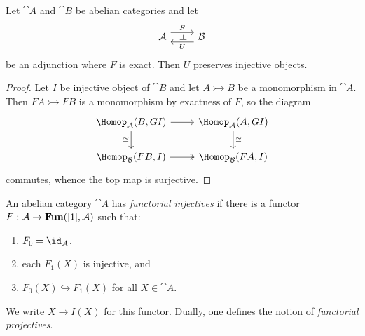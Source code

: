 \documentclass[../main.tex]{subfiles}
\begin{document}
\begin{lem}\label{lem:right-adjoint-to-exact-functor-preserves-injectives}
    Let $\cat A$ and $\cat B$ be abelian categories and let
    \begin{equation*}
      \begin{tikzcd}
        \cat A \ar[r, "F"{name=leftadj}, shift left=2] & \cat B \ar[l, "U"{name=rightadj}, shift left=2]
        \ar[from=leftadj, to=rightadj, phantom, "\leftadj" marking]
      \end{tikzcd}
    \end{equation*}
  be an adjunction where $F$ is exact. Then $U$ preserves injective objects.
\end{lem}
\begin{proof}
    Let $I$ be injective object of \(\cat B\) and let $A \rightarrowtail B$ be a monomorphism in $\cat A$. Then $FA \rightarrowtail FB$ is a monomorphism by exactness of $F$, so the diagram
\[\begin{tikzcd}
	{\Hom[\cat A](B, GI)} & {\Hom[\cat A](A, GI)} \\
	{\Hom[\cat B](FB, I)} & {\Hom[\cat B](FA, I)}
	\arrow[from=1-1, to=1-2]
	\arrow["\cong"', from=1-1, to=2-1]
	\arrow["\cong", from=1-2, to=2-2]
	\arrow[two heads, from=2-1, to=2-2]
\end{tikzcd}\]
commutes, whence the top map is surjective.
\end{proof}

\begin{defn}
    An abelian category $\cat A$ has \emph{functorial injectives} if there is a functor $F\colon \cat A \to \catFunctor([1], \cat A)$ such that:
    \begin{enumerate}
        \item $F_0 = \id_{\cat A}$,
        \item each $F_1(X)$ is injective, and
        \item $F_0(X)\hookrightarrow F_1(X)$ for all $X\in \cat A$.
    \end{enumerate}
    We write $X\to I(X)$ for this functor. Dually, one defines the notion of \emph{functorial projectives}. 
\end{defn}
\end{document}
